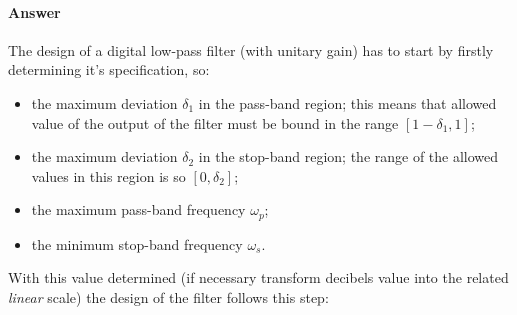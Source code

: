 	\paragraph{Answer} The design of a digital low-pass filter (with unitary gain) has to start by firstly determining it's specification, so:
	\begin{itemize}
		\item the maximum deviation $\delta_1$ in the pass-band region; this means that allowed value of the output of the filter must be bound in the range $[1-\delta_1,1]$;
		\item the maximum deviation $\delta_2$ in the stop-band region; the range of the allowed values in this region is so $[0,\delta_2]$;
		\item the maximum pass-band frequency $\omega_p$;
		\item the minimum stop-band frequency $\omega_s$.
	\end{itemize}
	With this value determined (if necessary transform decibels value into the related \textit{linear} scale) the design of the filter follows this step:
